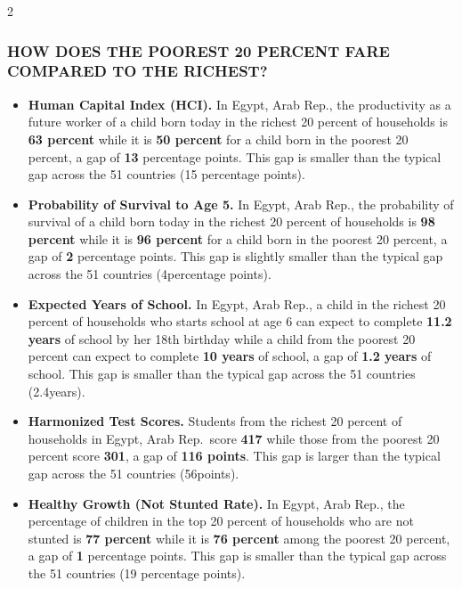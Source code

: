 \documentclass[8pt,]{article}
\begin{document}
\begin {multicols}{2}

\hypertarget{section}{%
\subsubsection{\texorpdfstring{\textcolor{bondiblue}{\textbf{H\small{OW DOES THE POOREST 20 PERCENT FARE COMPARED TO THE RICHEST?}}}}{}}\label{section}}

\begin{itemize}
\item
  \textbf{Human Capital Index (HCI).} In Egypt, Arab Rep., the
  productivity as a future worker of a child born today in the richest
  20 percent of households is \textbf{63 percent} while it is \textbf{50
  percent} for a child born in the poorest 20 percent, a gap of
  \textbf{13} percentage points. This gap is smaller than the typical
  gap across the 51 countries (15 percentage points).
\item
  \textbf{Probability of Survival to Age 5.} In Egypt, Arab Rep., the
  probability of survival of a child born today in the richest 20
  percent of households is \textbf{98 percent} while it is \textbf{96
  percent} for a child born in the poorest 20 percent, a gap of
  \textbf{2} percentage points. This gap is slightly smaller than the
  typical gap across the 51 countries (4percentage points).
\item
  \textbf{Expected Years of School.} In Egypt, Arab Rep., a child in the
  richest 20 percent of households who starts school at age 6 can expect
  to complete \textbf{11.2 years} of school by her 18th birthday while a
  child from the poorest 20 percent can expect to complete \textbf{10
  years} of school, a gap of \textbf{1.2 years} of school. This gap is
  smaller than the typical gap across the 51 countries (2.4years).
\item
  \textbf{Harmonized Test Scores.} Students from the richest 20 percent
  of households in Egypt, Arab Rep.~score \textbf{417} while those from
  the poorest 20 percent score \textbf{301}, a gap of \textbf{116
  points}. This gap is larger than the typical gap across the 51
  countries (56points).
\item
  \textbf{Healthy Growth (Not Stunted Rate).} In Egypt, Arab Rep., the
  percentage of children in the top 20 percent of households who are not
  stunted is \textbf{77 percent} while it is \textbf{76 percent} among
  the poorest 20 percent, a gap of \textbf{1} percentage points. This
  gap is smaller than the typical gap across the 51 countries (19
  percentage points).
\end{itemize}


\end{multicols}
\end{document}
